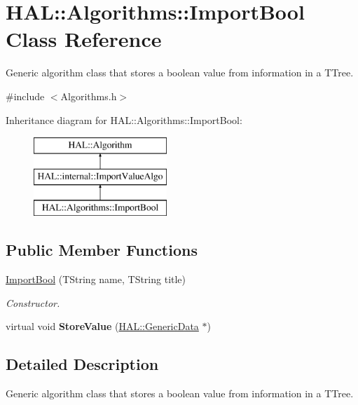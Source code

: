 \hypertarget{class_h_a_l_1_1_algorithms_1_1_import_bool}{\section{H\+A\+L\+:\+:Algorithms\+:\+:Import\+Bool Class Reference}
\label{class_h_a_l_1_1_algorithms_1_1_import_bool}
}


Generic algorithm class that stores a boolean value from information in a T\+Tree.  




{\ttfamily \#include $<$Algorithms.\+h$>$}

Inheritance diagram for H\+A\+L\+:\+:Algorithms\+:\+:Import\+Bool\+:\begin{figure}[H]
\begin{center}
\leavevmode
\includegraphics[height=3.000000cm]{class_h_a_l_1_1_algorithms_1_1_import_bool}
\end{center}
\end{figure}
\subsection*{Public Member Functions}
\begin{DoxyCompactItemize}
\item 
\hyperlink{class_h_a_l_1_1_algorithms_1_1_import_bool_a060a260af56afe85c10ff992a0a8b3fa}{Import\+Bool} (T\+String name, T\+String title)
\begin{DoxyCompactList}\small\item\em Constructor. \end{DoxyCompactList}\item 
\hypertarget{class_h_a_l_1_1_algorithms_1_1_import_bool_a5cb75ed42fe19b3c406d8defbf8aaa4f}{virtual void {\bfseries Store\+Value} (\hyperlink{class_h_a_l_1_1_generic_data}{H\+A\+L\+::\+Generic\+Data} $\ast$)}\label{class_h_a_l_1_1_algorithms_1_1_import_bool_a5cb75ed42fe19b3c406d8defbf8aaa4f}

\end{DoxyCompactItemize}


\subsection{Detailed Description}
Generic algorithm class that stores a boolean value from information in a T\+Tree. 

